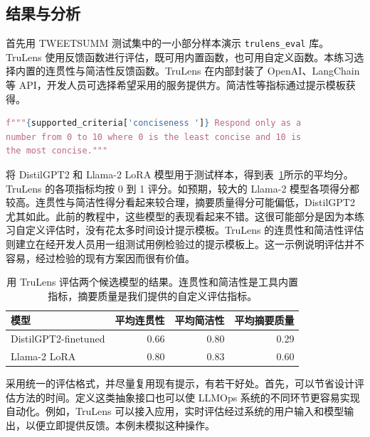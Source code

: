 \subsection{结果与分析}
首先用 TWEETSUMM 测试集中的一小部分样本演示 \texttt{trulens\_eval} 库。TruLens 使用反馈函数进行评估，既可用内置函数，也可用自定义函数。本练习选择内置的连贯性与简洁性反馈函数。TruLens 在内部封装了 OpenAI、LangChain 等 API，开发人员可选择希望采用的服务提供方。简洁性等指标通过提示模板获得。

\noindent\begin{minipage}{\linewidth}
\begin{lstlisting}[language=Python,caption={用于 TruLens 评估的系统提示模板示例。},label={lst:ch08-trulens-prompt}]
f"""{supported_criteria['conciseness ']} Respond only as a
number from 0 to 10 where 0 is the least concise and 10 is
the most concise."""
\end{lstlisting}
\end{minipage}\par

将 DistilGPT2 和 Llama-2 LoRA 模型用于测试样本，得到表~\ref{tab:ch08-trulens}所示的平均分。TruLens 的各项指标均按 0 到 1 评分。如预期，较大的 Llama-2 模型各项得分都较高。连贯性与简洁性得分看起来较合理，摘要质量得分可能偏低，DistilGPT2 尤其如此。此前的教程中，这些模型的表现看起来不错。这很可能部分是因为本练习自定义评估时，没有花太多时间设计提示模板。TruLens 的连贯性和简洁性评估则建立在经开发人员用一组测试用例检验过的提示模板上。这一示例说明评估并不容易，经过检验的现有方案因而很有价值。

\begin{table}[htbp]
\centering\small
\caption{用 TruLens 评估两个候选模型的结果。连贯性和简洁性是工具内置指标，摘要质量是我们提供的自定义评估指标。}
\label{tab:ch08-trulens}
\begin{tabular}{@{}lrrr@{}}
\toprule
模型 & 平均连贯性 & 平均简洁性 & 平均摘要质量\\
\midrule
DistilGPT2-finetuned & 0.66 & 0.80 & 0.29\\
Llama-2 LoRA & 0.80 & 0.83 & 0.60\\
\bottomrule
\end{tabular}
\end{table}

采用统一的评估格式，并尽量复用现有提示，有若干好处。首先，可以节省设计评估方法的时间。定义这类抽象接口也可以使 LLMOps 系统的不同环节更容易实现自动化。例如，TruLens 可以接入应用，实时评估经过系统的用户输入和模型输出，以便立即提供反馈。本例未模拟这种操作。

